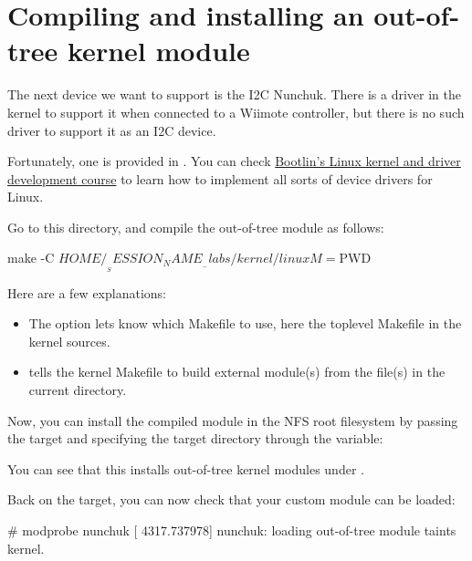 \section{Compiling and installing an out-of-tree kernel module}

The next device we want to support is the I2C Nunchuk. There is a driver
in the kernel to support it when connected to a Wiimote controller, but
there is no such driver to support it as an I2C device.

Fortunately, one is provided in
. You can check
\href{https://bootlin.com/training/kernel/}{Bootlin's Linux kernel and
driver development course} to learn how to implement all sorts of device
drivers for Linux.

Go to this directory, and compile the out-of-tree module as follows:

\begin{bashinput}
make -C $HOME/__SESSION_NAME__-labs/kernel/linux M=$PWD
\end{bashinput}

Here are a few explanations:
\begin{itemize}
\item The  option lets  know which Makefile to
      use, here the toplevel Makefile in the kernel sources.
\item {} tells the kernel Makefile to build external
      module(s) from the file(s) in the current directory.
\end{itemize}

Now, you can install the compiled module in the NFS root filesystem
by passing the  target and specifying the
target directory through the  variable:


You can see that this installs out-of-tree kernel modules under
.

Back on the target, you can now check that your custom module can
be loaded:

\begin{bashinput}
# modprobe nunchuk
[ 4317.737978] nunchuk: loading out-of-tree module taints kernel.
\end{bashinput}

